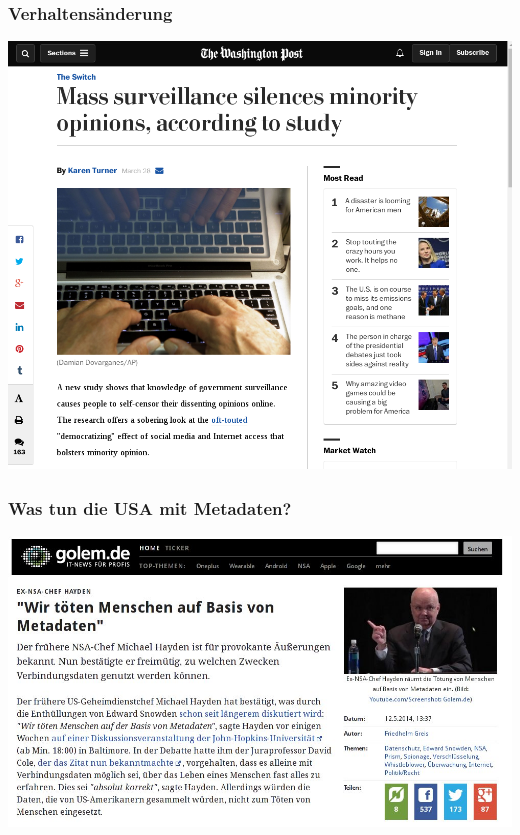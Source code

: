 \documentclass[12pt]{beamer}
\begin{document}
\begin{frame}
  \frametitle{Verhaltensänderung}
  \begin{center}
    \includegraphics[height=0.7\textheight]{img/verhalten.png}
  \end{center}
\end{frame}

\begin{frame}
  \frametitle{Was tun die USA mit Metadaten?}
  \pause
  \begin{center}
    \includegraphics[height=0.7\textheight]{img/wekillpeople.jpg}
  \end{center}
\end{frame}
\end{document}
